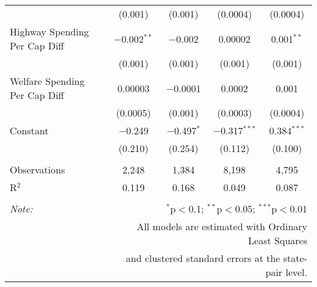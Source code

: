 \begin{table}[!htbp]
\begin{tabular}{@{\extracolsep{5pt}}lcccc}
  & (0.001) & (0.001) & (0.0004) & (0.0004) \\ 
  Highway Spending Per Cap Diff & $-$0.002$^{**}$ & $-$0.002 & 0.00002 & 0.001$^{**}$ \\ 
  & (0.001) & (0.001) & (0.001) & (0.001) \\ 
  Welfare Spending Per Cap Diff & 0.00003 & $-$0.0001 & 0.0002 & 0.001 \\ 
  & (0.0005) & (0.001) & (0.0003) & (0.0004) \\ 
  Constant & $-$0.249 & $-$0.497$^{*}$ & $-$0.317$^{***}$ & 0.384$^{***}$ \\ 
  & (0.210) & (0.254) & (0.112) & (0.100) \\ 
 \hline \\[-1.8ex] 
Observations & 2,248 & 1,384 & 8,198 & 4,795 \\ 
R$^{2}$ & 0.119 & 0.168 & 0.049 & 0.087 \\ 
\hline 
\hline \\[-1.8ex] 
\textit{Note:}  & \multicolumn{4}{r}{$^{*}$p$<$0.1; $^{**}$p$<$0.05; $^{***}$p$<$0.01} \\ 
 & \multicolumn{4}{r}{All models are estimated with Ordinary Least Squares} \\ 
 & \multicolumn{4}{r}{and clustered standard errors at the state-pair level.} \\ 
\end{tabular} 
\end{table} 
